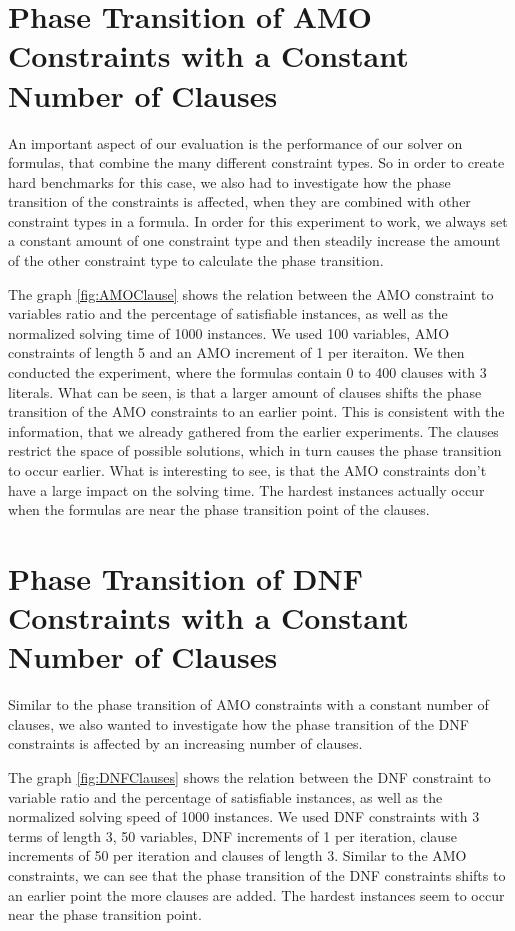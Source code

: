 \section{Phase Transition of AMO Constraints with a Constant Number of Clauses}

An important aspect of our evaluation is the performance of our solver on formulas, that combine the many different constraint types. So in order to create hard benchmarks for this case, we also had to investigate how the phase transition of the constraints is affected, when they are combined with other constraint types in a formula. In order for this experiment to work, we always set a constant amount of one constraint type and then steadily increase the amount of the other constraint type to calculate the phase transition.

	

The graph \ref{fig:AMOClause} shows the relation between the AMO constraint to variables ratio and the percentage of satisfiable instances, as well as the normalized solving time of 1000 instances. We used 100 variables, AMO constraints of length 5 and an AMO increment of 1 per iteraiton. We then conducted the experiment, where the formulas contain 0 to 400 clauses with 3 literals. What can be seen, is that a larger amount of clauses shifts the phase transition of the AMO constraints to an earlier point. This is consistent with the information, that we already gathered from the earlier experiments. The clauses restrict the space of possible solutions, which in turn causes the phase transition to occur earlier. What is interesting to see, is that the AMO constraints don't have a large impact on the solving time. The hardest instances actually occur when the formulas are near the phase transition point of the clauses.

\section{Phase Transition of DNF Constraints with a Constant Number of Clauses}

Similar to the phase transition of AMO constraints with a constant number of clauses, we also wanted to investigate how the phase transition of the DNF constraints is affected by an increasing number of clauses.

	

The graph \ref{fig:DNFClauses} shows the relation between the DNF constraint to variable ratio and the percentage of satisfiable instances, as well as the normalized solving speed of 1000 instances. We used DNF constraints with 3 terms of length 3, 50 variables, DNF increments of 1 per iteration, clause increments of 50 per iteration and clauses of length 3. Similar to the AMO constraints, we can see that the phase transition of the DNF constraints shifts to an earlier point the more clauses are added. The hardest instances seem to occur near the phase transition point.

